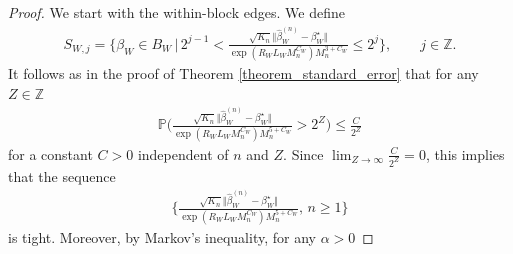 \documentclass{article}
\begin{document}
\begin{proof}
We start with the within-block edges. We define 
\begin{align*}
    S_{W,j}= \bigg\{ \beta_W \in B_W \, \vert \, 2^{j-1} < \frac{\sqrt{K_n}\Vert \hat{\beta}_W^{(n)} - \beta_W^{\star} \Vert}{\exp(R_WL_WM_n^{C_W}) M_n^{3+C_W}} \leq 2^j \bigg\} , \qquad j \in \mathbb{Z}.
\end{align*}
It follows as in  the proof of Theorem \ref{theorem_standard_error} that for any $Z \in \mathbb{Z}$
\begin{align*}
    \mathbb{P}\bigg( \frac{\sqrt{K_n}\Vert \hat{\beta}_W^{(n)} - \beta_W^{\star} \Vert}{\exp(R_WL_WM_n^{C_W}) M_n^{5+C_W}} > 2^Z \bigg) \leq  \frac{C }{2^Z}
\end{align*}
for a constant $C  >0$ independent of $n$ and $Z$. Since $\lim_{Z \rightarrow \infty}    \frac{C}{2^Z}= 0$, this implies that the sequence 
\begin{align} \label{proof_as_norm_tight_seq}
    \bigg\{\frac{\sqrt{K_n}\Vert \hat{\beta}_W^{(n)} - \beta_W^{\star} \Vert}{\exp(R_WL_WM_n^{C_W}) M_n^{5+C_W}} , \, n \geq 1 \bigg\}
\end{align}
is tight. Moreover,  by Markov's inequality,   for any $\alpha>0$


\end{proof}
\end{document}
